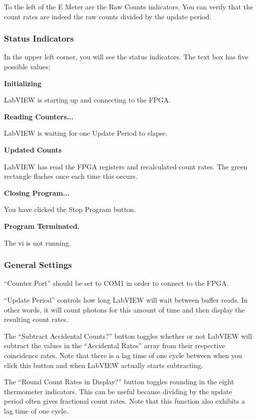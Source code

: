\documentclass{../lab}
\begin{document}
To the left of the E Meter are the Raw Counts indicators. You can verify that the count rates are indeed the raw counts divided by the update period.

\subsubsection{Status Indicators}

In the upper left corner, you will see the status indicators. The text box has five possible values:

\textbf{Initializing}

LabVIEW is starting up and connecting to the FPGA.

\textbf{Reading Counters...}

LabVIEW is waiting for one Update Period to elapse.

\textbf{Updated Counts}

LabVIEW has read the FPGA registers and recalculated count rates. The green rectangle flashes once each time this occurs.

\textbf{Closing Program...}

You have clicked the Stop Program button.

\textbf{Program Terminated.}

The vi is not running.

\subsubsection{General Settings}

``Counter Port'' should be set to COM1 in order to connect to the FPGA.

``Update Period'' controls how long LabVIEW will wait between buffer reads. In other words, it will count photons for this amount of time and then display the resulting count rates.

The ``Subtract Accidental Counts?'' button toggles whether or not LabVIEW will subtract the values in the ``Accidental Rates'' array from their respective coincidence rates. Note that there is a lag time of one cycle between when you click this button and when LabVIEW actually starts subtracting.

The ``Round Count Rates in Display?'' button toggles rounding in the eight thermometer indicators. This can be useful because dividing by the update period often gives fractional count rates. Note that this function also exhibits a lag time of one cycle.
\end{document}
